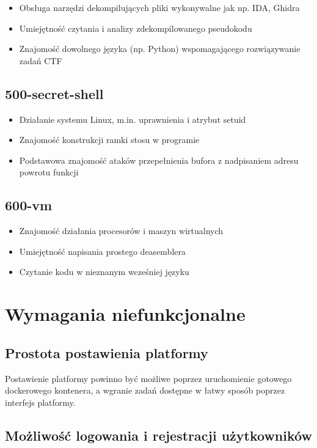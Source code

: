 \documentclass[language=polish,type=eng]{aghmodern}
\begin{document}
\begin{itemize}
    \item Obsługa narzędzi dekompilujących pliki wykonywalne jak np. IDA, Ghidra
    \item Umiejętność czytania i analizy zdekompilowanego pseudokodu
    \item Znajomość dowolnego języka (np. Python) wspomagającego rozwiązywanie zadań CTF
\end{itemize}

\subsection{500-secret-shell}

\begin{itemize}
    \item Działanie systemu Linux, m.in. uprawnienia i atrybut setuid
    \item Znajomość konstrukcji ramki stosu w programie
    \item Podstawowa znajomość ataków przepełnienia bufora z nadpisaniem adresu powrotu funkcji
\end{itemize}

\subsection{600-vm}

\begin{itemize}
    \item Znajomość działania procesorów i maszyn wirtualnych
    \item Umiejętność napisania prostego deasemblera
    \item Czytanie kodu w nieznanym wcześniej języku
\end{itemize}

\section{Wymagania niefunkcjonalne}

\subsection{Prostota postawienia platformy}

Postawienie platformy powinno być możliwe poprzez uruchomienie gotowego
dockerowego kontenera, a wgranie zadań dostępne w łatwy sposób
poprzez interfejs platformy.

\subsection{Możliwość logowania i rejestracji użytkowników}
\end{document}
